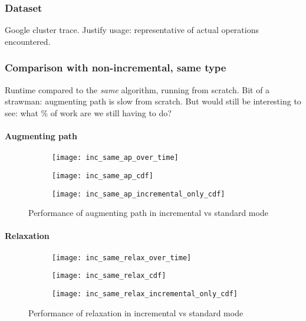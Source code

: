 \subsubsection{Dataset}

Google cluster trace. Justify usage: representative of actual operations encountered.

\subsubsection{Comparison with non-incremental, same type}

Runtime compared to the {\it same} algorithm, running from scratch. Bit of a strawman: augmenting path is slow from scratch. But would still be interesting to see: what \% of work are we still having to do?

\paragraph{Augmenting path}

\begin{figure}
    \centering
    \begin{subfigure}[c]{0.9\textwidth}
        \texttt{[image: inc\_same\_ap\_over\_time]}
    \end{subfigure}
    \begin{subfigure}[c]{0.45\textwidth}
        \texttt{[image: inc\_same\_ap\_cdf]}
    \end{subfigure}
   \begin{subfigure}[c]{0.45\textwidth}
       \texttt{[image: inc\_same\_ap\_incremental\_only\_cdf]}
    \end{subfigure}
    \caption{Performance of augmenting path in incremental vs standard mode}
    \label{fig:inc-same-ap}
\end{figure}

\paragraph{Relaxation}

\begin{figure}
    \centering
    \begin{subfigure}[c]{0.9\textwidth}
        \texttt{[image: inc\_same\_relax\_over\_time]}
    \end{subfigure}
    \begin{subfigure}[c]{0.45\textwidth}
        \texttt{[image: inc\_same\_relax\_cdf]}
    \end{subfigure}
    \begin{subfigure}[c]{0.45\textwidth}
        \texttt{[image: inc\_same\_relax\_incremental\_only\_cdf]}
    \end{subfigure}
    \caption{Performance of relaxation in incremental vs standard mode}
    \label{fig:inc-same-relax}
\end{figure}

